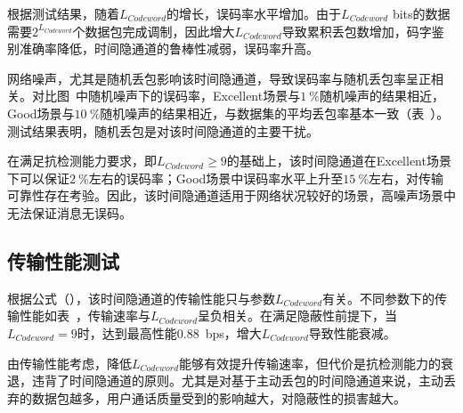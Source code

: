 根据测试结果，随着$L_{Codeword}$的增长，误码率水平增加。由于$L_{Codeword}$ bits的数据需要$2^{L_{Codeword}}$个数据包完成调制，因此增大$L_{Codeword}$导致累积丢包数增加，码字鉴别准确率降低，时间隐通道的鲁棒性减弱，误码率升高。

网络噪声，尤其是随机丢包影响该时间隐通道，导致误码率与随机丢包率呈正相关。对比图\ 中随机噪声下的误码率，Excellent场景与{$1\ \%$}随机噪声的结果相近，Good场景与{$10\ \%$}随机噪声的结果相近，与数据集的平均丢包率基本一致（表\ ）。测试结果表明，随机丢包是对该时间隐通道的主要干扰。

在满足抗检测能力要求，即$L_{Codeword}\ge 9$的基础上，该时间隐通道在Excellent场景下可以保证{$2\ \%$}左右的误码率；Good场景中误码率水平上升至{$15\ \%$}左右，对传输可靠性存在考验。因此，该时间隐通道适用于网络状况较好的场景，高噪声场景中无法保证消息无误码。

\subsection{传输性能测试}
\label{chap:zigzag:results:throughput}


根据公式（），该时间隐通道的传输性能只与参数$L_{Codeword}$有关。不同参数下的传输性能如表\ ，传输速率与$L_{Codeword}$呈负相关。在满足隐蔽性前提下，当$L_{Codeword}=9$时，达到最高性能{0.88\ bps}，增大$L_{Codeword}$导致性能衰减。

由传输性能考虑，降低$L_{Codeword}$能够有效提升传输速率，但代价是抗检测能力的衰退，违背了时间隐通道的原则。尤其是对基于主动丢包的时间隐通道来说，主动丢弃的数据包越多，用户通话质量受到的影响越大，对隐蔽性的损害越大。

